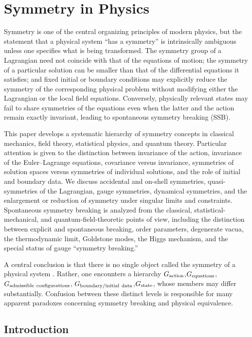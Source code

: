 \chapter {Symmetry in Physics}
\label{sp}

Symmetry is one of the central organizing principles of modern physics, but the
statement that a physical system ``has a symmetry'' is intrinsically ambiguous
unless one specifies  what  is being transformed.  The symmetry group of a
Lagrangian need not coincide with that of the equations of motion; the symmetry
of a particular solution can be smaller than that of the differential equations
it satisfies; and fixed initial or boundary conditions may explicitly reduce
the symmetry of the corresponding physical problem without modifying either the
Lagrangian or the local field equations.  Conversely, physically relevant
states may fail to share symmetries of the equations even when the latter and
the action remain exactly invariant, leading to spontaneous symmetry breaking
(SSB).

This paper develops a systematic hierarchy of symmetry concepts in classical
mechanics, field theory, statistical physics, and quantum theory.  Particular
attention is given to the distinction between invariance of the action,
invariance of the Euler--Lagrange equations, covariance versus invariance,
symmetries of solution spaces versus symmetries of individual solutions, and
the role of initial and boundary data.  We discuss accidental and on-shell
symmetries, quasi-symmetries of the Lagrangian, gauge symmetries, dynamical
symmetries, and the enlargement or reduction of symmetry under singular limits
and constraints.  Spontaneous symmetry breaking is analyzed from the classical,
statistical-mechanical, and quantum-field-theoretic points of view, including
the distinction between explicit and spontaneous breaking, order parameters,
degenerate vacua, the thermodynamic limit, Goldstone modes, the Higgs
mechanism, and the special status of gauge ``symmetry breaking.''

A central conclusion is that there is no single object called  the symmetry of
a physical system .  Rather, one encounters a hierarchy
$G_{\rm action}$,$G_{\rm equations}$,$G_{\rm admissible\ configurations}$,
$G_{\rm boundary/initial\ data}$,$G_{\rm state}$,
whose members may differ substantially.  Confusion between these distinct
levels is responsible for many apparent paradoxes concerning symmetry breaking
and physical equivalence.

\section{ Introduction}
\label{sp:in}

